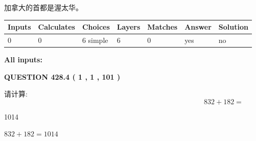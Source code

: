 \documentclass{ctexart}
\begin{document}
 
加拿大的首都是渥太华。
 
 
\noindent{}
 
 
   
   
   
   
\noindent\begin{tabular}{|l|l|l|l|l|l|l|}
 \hline
Inputs & Calculates & Choices & Layers & Matches & Answer & Solution \\ \hline
 0  & 
 0  & 
 6
  simple  
  & 
 6  & 
 0  & 
  yes & 
  no 
  \\ \hline
 \end{tabular}
   
   
   
   
\noindent{}
   
   
   
   
\noindent\vspace{0.1in}\hspace{-0.08in} {\textbf{\Large{All inputs: }}}
   
   
  
\vspace{0.2in}
  
{\textbf{\Large{QUESTION
428.4 
 ( 1 , 1 , 101 )
}}}
  
  
 
请计算:
\begin{equation}
832 +  %
182 = \nonumber
\end{equation}
 
 
 
\noindent{}
 
 

1014
 
 
\noindent{}
 
 

 
 
 
\noindent{}
 
 

$ %
832 +  %
182=   %
1014$
 
 
\noindent{}
 
\end{document}
